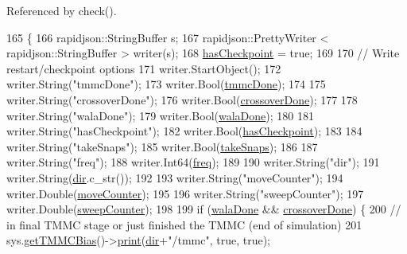 Referenced by check().


\begin{DoxyCode}
165                                                                                                         \{
166     rapidjson::StringBuffer s;
167     rapidjson::PrettyWriter < rapidjson::StringBuffer > writer(s);
168     \hyperlink{classcheckpoint_aa75f306fcb0c2360d948fa3a61adfed5}{hasCheckpoint} = \textcolor{keyword}{true};
169 
170     \textcolor{comment}{// Write restart/checkpoint options}
171     writer.StartObject();
172     writer.String(\textcolor{stringliteral}{"tmmcDone"});
173     writer.Bool(\hyperlink{classcheckpoint_acbe0c62aa82735741a9f396827966823}{tmmcDone});
174 
175     writer.String(\textcolor{stringliteral}{"crossoverDone"});
176     writer.Bool(\hyperlink{classcheckpoint_a4f13612ea6d376bb327295bfce3a70c5}{crossoverDone});
177 
178     writer.String(\textcolor{stringliteral}{"walaDone"});
179     writer.Bool(\hyperlink{classcheckpoint_aab066479e2ca6656d0031dd46a2fc1a5}{walaDone});
180 
181     writer.String(\textcolor{stringliteral}{"hasCheckpoint"});
182     writer.Bool(\hyperlink{classcheckpoint_aa75f306fcb0c2360d948fa3a61adfed5}{hasCheckpoint});
183 
184     writer.String(\textcolor{stringliteral}{"takeSnaps"});
185     writer.Bool(\hyperlink{classcheckpoint_a685226e8bae8084937f73f65c326c362}{takeSnaps});
186 
187     writer.String(\textcolor{stringliteral}{"freq"});
188     writer.Int64(\hyperlink{classcheckpoint_a11a2d78eb0bf6045b659a4d18b53da44}{freq});
189 
190     writer.String(\textcolor{stringliteral}{"dir"});
191     writer.String(\hyperlink{classcheckpoint_a0e0f999ee8e0b09541e9131baa8a591d}{dir}.c\_str());
192 
193     writer.String(\textcolor{stringliteral}{"moveCounter"});
194     writer.Double(\hyperlink{classcheckpoint_a5ab49a355714da4874aba00eb03f701d}{moveCounter});
195 
196     writer.String(\textcolor{stringliteral}{"sweepCounter"});
197     writer.Double(\hyperlink{classcheckpoint_ad011ddbca1ea708321335b1b3ac67e07}{sweepCounter});
198 
199     \textcolor{keywordflow}{if} (\hyperlink{classcheckpoint_aab066479e2ca6656d0031dd46a2fc1a5}{walaDone} && \hyperlink{classcheckpoint_a4f13612ea6d376bb327295bfce3a70c5}{crossoverDone}) \{
200         \textcolor{comment}{// in final TMMC stage or just finished the TMMC (end of simulation)}
201         sys.\hyperlink{classsim_system_aa31d40c91cb50f143a9613d362798887}{getTMMCBias}()->\hyperlink{classtmmc_ad49e147dc88b3e1c2975269598f94327}{print}(\hyperlink{classcheckpoint_a0e0f999ee8e0b09541e9131baa8a591d}{dir}+\textcolor{stringliteral}{"/tmmc"}, \textcolor{keyword}{true}, \textcolor{keyword}{true});

\end{DoxyCode}
